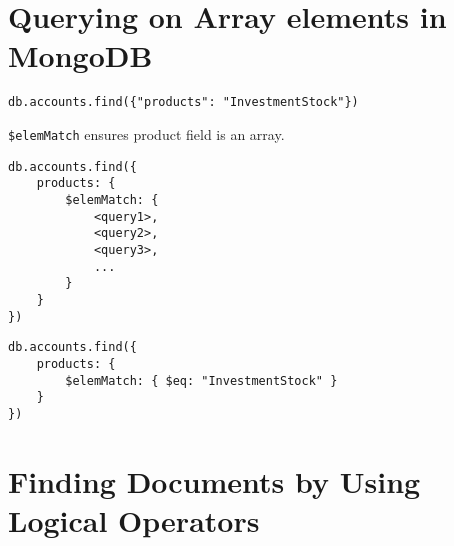 \documentclass[../main.tex]{subfiles}
\begin{document}
\section{Querying on Array elements in MongoDB}
\begin{lstlisting}[language=MongoDB]
db.accounts.find({"products": "InvestmentStock"})
\end{lstlisting}

\lstinline{$elemMatch} ensures product field is an array.

\begin{lstlisting}[language=MongoDB]
db.accounts.find({
	products: {
		$elemMatch: {
			<query1>,
			<query2>,
			<query3>,
			...
		}
	}
})
\end{lstlisting}


\begin{lstlisting}[language=MongoDB]
db.accounts.find({
	products: {
		$elemMatch: { $eq: "InvestmentStock" }
	}
})
\end{lstlisting}


\section{Finding Documents by Using Logical Operators}

\printglossaries
\end{document}
